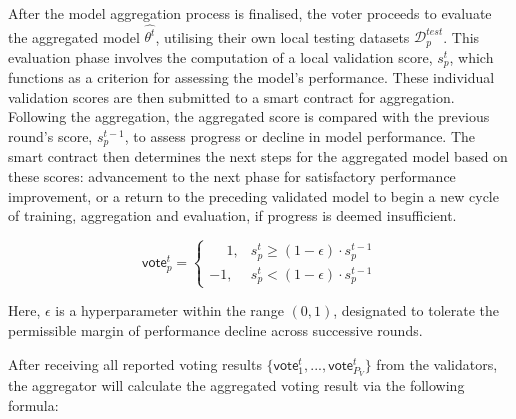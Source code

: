 \documentclass[conference]{IEEEtran}
\newcommand{\rui}[1]{{\color{black} #1}}
\begin{document}
\begin{itemize}

    \rui{\item After the model aggregation process is finalised, the voter proceeds to evaluate the aggregated model $\hat{\theta^t}$, utilising their own local testing datasets $\mathcal{D}_p^{test}$. This evaluation phase involves the computation of a local validation score, $s^{t}_p$, which functions as a criterion for assessing the model's performance. These individual validation scores are then submitted to a smart contract for aggregation. Following the aggregation, the aggregated score is compared with the previous round's score, $s^{t-1}_p$, to assess progress or decline in model performance. The smart contract then determines the next steps for the aggregated model based on these scores: advancement to the next phase for satisfactory performance improvement, or a return to the preceding validated model to begin a new cycle of training, aggregation and evaluation, if progress is deemed insufficient.
    }

\begin{equation*}
  \mathsf{vote}_p^t =
    \begin{cases}
      \phantom{+}1, & s^{t}_p \ge (1 - \epsilon) \cdot s^{t-1}_p \\
      -1, & s^{t}_p < (1 - \epsilon)\cdot  s^{t-1}_p
    \end{cases} 
\end{equation*}

Here, $\epsilon$ is a hyperparameter within the range $(0, 1)$, designated to tolerate the permissible margin of performance decline across successive rounds.

\item After receiving all reported voting results $\{\mathsf{vote}_1^t, ..., \mathsf{vote}_{P_V}^t\}$ from the validators, the aggregator will  calculate the aggregated voting result via the following formula:


\end{itemize}
\end{document}

